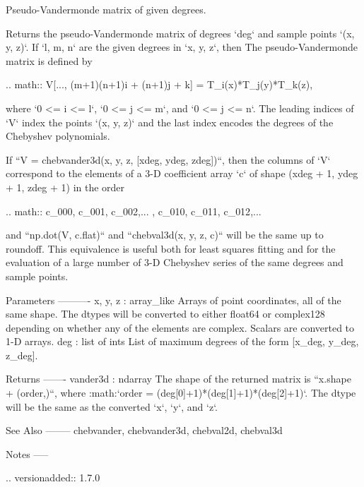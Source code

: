 \begin{DoxyVerb}Pseudo-Vandermonde matrix of given degrees.

Returns the pseudo-Vandermonde matrix of degrees `deg` and sample
points `(x, y, z)`. If `l, m, n` are the given degrees in `x, y, z`,
then The pseudo-Vandermonde matrix is defined by

.. math:: V[..., (m+1)(n+1)i + (n+1)j + k] = T_i(x)*T_j(y)*T_k(z),

where `0 <= i <= l`, `0 <= j <= m`, and `0 <= j <= n`.  The leading
indices of `V` index the points `(x, y, z)` and the last index encodes
the degrees of the Chebyshev polynomials.

If ``V = chebvander3d(x, y, z, [xdeg, ydeg, zdeg])``, then the columns
of `V` correspond to the elements of a 3-D coefficient array `c` of
shape (xdeg + 1, ydeg + 1, zdeg + 1) in the order

.. math:: c_{000}, c_{001}, c_{002},... , c_{010}, c_{011}, c_{012},...

and ``np.dot(V, c.flat)`` and ``chebval3d(x, y, z, c)`` will be the
same up to roundoff. This equivalence is useful both for least squares
fitting and for the evaluation of a large number of 3-D Chebyshev
series of the same degrees and sample points.

Parameters
----------
x, y, z : array_like
    Arrays of point coordinates, all of the same shape. The dtypes will
    be converted to either float64 or complex128 depending on whether
    any of the elements are complex. Scalars are converted to 1-D
    arrays.
deg : list of ints
    List of maximum degrees of the form [x_deg, y_deg, z_deg].

Returns
-------
vander3d : ndarray
    The shape of the returned matrix is ``x.shape + (order,)``, where
    :math:`order = (deg[0]+1)*(deg[1]+1)*(deg[2]+1)`.  The dtype will
    be the same as the converted `x`, `y`, and `z`.

See Also
--------
chebvander, chebvander3d, chebval2d, chebval3d

Notes
-----

.. versionadded:: 1.7.0\end{DoxyVerb}
 \mbox{\label{namespacenumpy_1_1polynomial_1_1chebyshev_a5678577142c267addada7b0ccec27407}} 
